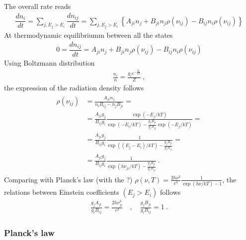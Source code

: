 \documentclass[letterpaper,10pt,english]{jupyterBook}
\begin{document}
\sphinxAtStartPar
The overall rate reads
\begin{equation*}
\begin{split}\dfrac{d n_i}{d t} = \sum_{j, E_j > E_i} \dfrac{d n_{ij}}{d t} = \sum_{j, E_j > E_i} \left\{ A_{ji} n_j + B_{ji} n_j \rho(\nu_{ij}) - B_{ij} n_i \rho(\nu_{ij}) \right\} \end{split}
\end{equation*}
\sphinxAtStartPar
At thermodynamic equilibriumm between all the states
\begin{equation*}
\begin{split}0 = \dfrac{d n_{ij}}{d t} = A_{ji} n_j + B_{ji} n_j \rho(\nu_{ij}) - B_{ij} n_i \rho(\nu_{ij})\end{split}
\end{equation*}
\sphinxAtStartPar
Using Boltzmann distribution
\begin{equation*}
\begin{split}\frac{n_i}{n} = \frac{g_i e^{-\frac{E_i}{kT}}}{Z} \ ,\end{split}
\end{equation*}
\sphinxAtStartPar
the expression of the radiation density follows
\begin{equation*}
\begin{split}\begin{aligned}
  \rho(\nu_{ij})
  & = \frac{A_{ji} n_j}{n_i B_{ij} - n_j B_{ji}} = \\
  & = \frac{A_{ji} g_j}{B_{ij} g_i} \frac{ \exp(-E_j/kT) }{ \exp(-E_i/kT) - \frac{g_j B_{ji}}{g_i B_{ij}} \exp(-E_j/kT)} = \\
  & = \frac{A_{ji} g_j}{B_{ij} g_i} \frac{ 1 }{ \exp((E_j-E_i)/kT) - \frac{g_j B_{ji}}{g_i B_{ij}}} = \\
  & = \frac{A_{ji} g_j}{B_{ij} g_i} \frac{ 1 }{ \exp(h \nu_{ji}/kT) - \frac{g_j B_{ji}}{g_i B_{ij}}} \ .
\end{aligned}\end{split}
\end{equation*}
\sphinxAtStartPar
Comparing with Planck’s law (with the ?) \(\rho(\nu, T) = \frac{2 h \nu^3}{c^3} \frac{1}{\exp(h \nu /kT) - 1}\), the relations between Einstein coefficients \((E_j > E_i)\) follows
\begin{equation}\label{equation:ch/quantum-mechanics/history/einstein-planck:eq:einstein-coeffs:relations}
\begin{split}\frac{g_j A_{ji}}{g_i B_{ij}} = \frac{2 h \nu_{ji}^3}{c^3} \quad , \quad \frac{g_j B_{ji}}{g_i B_{ij}} = 1 \ .\end{split}
\end{equation}\subsubsection*{Planck’s law}
\end{document}
